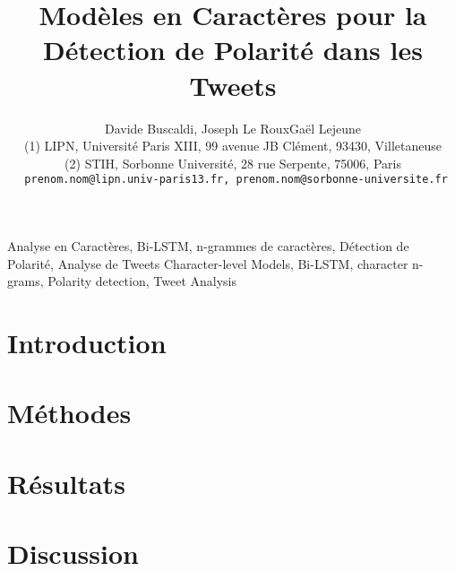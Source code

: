 \documentclass[10pt,twoside]{article}
\title{Modèles en Caractères pour la Détection de Polarité dans les Tweets}
\author{Davide Buscaldi, %
 Joseph Le Roux\up{1}\quad Gaël Lejeune\up{2}\\
  {\small
    (1) LIPN, Université Paris XIII, 99 avenue JB Clément, 93430, Villetaneuse \\ 
    (2) STIH, Sorbonne Université, 28 rue Serpente, 75006, Paris \\ 
    \texttt{
      prenom.nom@lipn.univ-paris13.fr, prenom.nom@sorbonne-universite.fr \\ 
}}}
\begin{document}
\maketitle

\resume{

}


\motsClefs
  {Analyse en Caractères, Bi-LSTM, n-grammes de caractères, Détection de Polarité, Analyse de Tweets}
  {Character-level Models, Bi-LSTM, character n-grams, Polarity detection, Tweet Analysis}


\section{Introduction}


%

\section{Méthodes}


\section{Résultats}


\section{Discussion}







\end{document}
